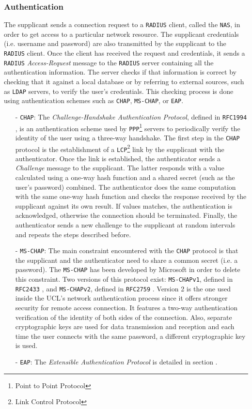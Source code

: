 \subsubsection{Authentication}
The supplicant sends a connection request to a \texttt{RADIUS} client, called the \texttt{NAS}, in order to get access to a particular network resource. The supplicant credentials (i.e. username and password) are also transmitted by the supplicant to the \texttt{RADIUS} client. Once the client has received the request and credentials, it sends a \texttt{RADIUS} \textit{Access-Request} message to the \texttt{RADIUS} server containing all the authentication information. The server checks if that information is correct by checking that it against a local database or by referring to external sources, such as \texttt{LDAP} servers, to verify the user's credentials. This checking process is done using authentication schemes such as \texttt{CHAP}, \texttt{MS-CHAP}, or \texttt{EAP}.
	\begin{itemize}
		\item [-] \texttt{CHAP}: The \textit{Challenge-Handshake Authentication Protocol}, defined in \texttt{RFC1994} \cite{rfc1994}, is an authentication scheme used by \texttt{PPP}\footnote{Point to Point Protocol} servers to periodically verify the identity of the user using a three-way handshake. The first step in the \texttt{CHAP} protocol is the establishment of a \texttt{LCP}\footnote{Link Control Protocol} link by the supplicant with the authenticator. Once the link is established, the authenticator sends a \textit{Challenge} message to the supplicant. The latter responds with a value calculated using a one-way hash function and a shared secret (such as the user's password) combined. The authenticator does the same computation with the same one-way hash function and checks the response received by the supplicant against its own result. If values matches, the authentication is acknowledged, otherwise the connection should be terminated. Finally, the authenticator sends a new challenge to the supplicant at random intervals and repeats the steps described before.

		\item [-] \texttt{MS-CHAP}: The main constraint encountered with the \texttt{CHAP} protocol is that the supplicant and the authenticator need to share a common secret (i.e. a password). The \texttt{MS-CHAP} has been developed by Microsoft in order to delete this constraint. Two versions of this protocol exist: \texttt{MS-CHAPv1}, defined in \texttt{RFC2433} \cite{rfc2433}, and \texttt{MS-CHAPv2}, defined in \texttt{RFC2759} \cite{rfc2759}. Version 2 is the one used inside the UCL's network authentication process since it offers stronger security for remote access connection. It features a two-way authentication verification of the identity of both sides of the connection. Also, separate cryptographic keys are used for data transmission and reception and each time the user connects with the same password, a different cryptographic key is used.

		\item [-] \texttt{EAP}: The \textit{Extensible Authentication Protocol} is detailed in section .
	\end{itemize}

